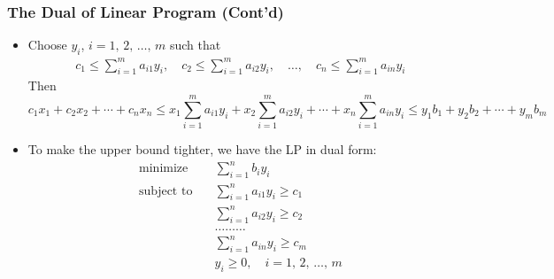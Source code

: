 \documentclass[usenames,dvipsnames,8pt]{beamer}%
\renewcommand{\ds}{\displaystyle}
\begin{document}
\begin{frame}
  \frametitle{The Dual of Linear Program (Cont'd)}
  \begin{itemize}\setlength{\itemsep=0pt}
    \item Choose $\ds y_i$, $\ds i = 1,\,2,\,\ldots,\,m$ such that
      \begingroup
      \addtolength{\jot}{-2pt}
      \begin{align*}
        c_1 \leqslant \sum_{i=1}^m a_{i1}y_i, \quad c_2 \leqslant \sum_{i=1}^m a_{i2}y_i, \quad \ldots, \quad c_n \leqslant \sum_{i=1}^m a_{in}y_i
      \end{align*}
      \endgroup
      Then $$c_1 x_1 + c_2 x_2 + \cdots + c_n x_n \leqslant x_1\sum_{i=1}^m a_{i1}y_i + x_2\sum_{i=1}^m a_{i2}y_i + \cdots + x_n\sum_{i=1}^m a_{in}y_i \leqslant y_1 b_1 + y_2 b_2 + \cdots + y_m b_m$$
    \item To make the upper bound tighter, we have the LP in dual form: 
      \begingroup
      \addtolength{\jot}{-2pt}
      \begin{align*}
        \text{minimize}  \quad& \sum_{i=1}^n b_i y_i \\
        \text{subject to}\quad& \sum_{i=1}^n a_{i1}y_i\geqslant c_1\\
                              & \sum_{i=1}^n a_{i2}y_i\geqslant c_2\\
                              & \ldots \ldots \ldots\\
                              & \sum_{i=1}^n a_{in}y_i\geqslant c_m\\
                              & y_i\geqslant 0, \quad i= 1,\,2,\,\ldots,\,m 
      \end{align*}
      \endgroup
  \end{itemize}
\end{frame}
\end{document}
